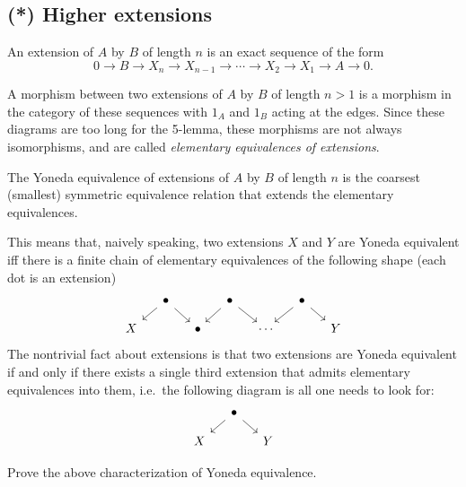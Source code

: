 



\subsection{(*) Higher extensions}

\begin{defn}
    An extension of $A$ by $B$ of length $n$ is an exact sequence of the form
    \[0\to B\to X_n\to X_{n-1}\to \cdots \to X_2\to X_1\to A\to 0.\]

    A morphism between two extensions of $A$ by $B$ of length $n>1$ is a morphism in the category of these sequences with $1_A$ and $1_B$ acting at the edges. Since these diagrams are too long for the 5-lemma, these morphisms are not always isomorphisms, and are called \emph{elementary equivalences of extensions}.
\end{defn}


\begin{defn}
    The Yoneda equivalence of extensions of $A$ by $B$ of length $n$ is the coarsest (smallest) symmetric equivalence relation that extends the elementary equivalences.
\end{defn}

This means that, naively speaking, two extensions $X$ and $Y$ are Yoneda equivalent iff there is a finite chain of elementary equivalences of the following shape (each dot is an extension)
    \[\begin{tikzcd}[column sep=small,row sep=small]
                 & \bullet\arrow[dl]\arrow[dr]&         & \bullet\arrow[dl]\arrow[dr] &         &  \bullet\arrow[dl]\arrow[dr] \\
        X  &                             &\bullet &                             &\cdots &                             &Y 
    \end{tikzcd}\]
The nontrivial fact about extensions is that two extensions are Yoneda equivalent  if and only if there exists a single third extension that admits elementary equivalences into them, i.e.~the following diagram is all one needs to look for:
    \[\begin{tikzcd}[column sep=small,row sep=small]
                 & \bullet\arrow[dl]\arrow[dr]&         \\
        X  &                                & Y
    \end{tikzcd}\]


\begin{xca}
    Prove the above characterization of Yoneda equivalence.
\end{xca}

